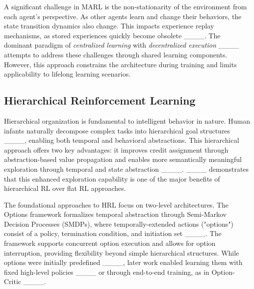 
A significant challenge in MARL is the non-stationarity of the environment from each agent's perspective. As other agents learn and change their behaviors, the state transition dynamics also change. This impacts experience replay mechanisms, as stored experiences quickly become obsolete ____. The dominant paradigm of \emph{centralized learning} with \emph{decentralized execution} ____ attempts to address these challenges through shared learning components. However, this approach constrains the architecture during training and limits applicability to lifelong learning scenarios.


\subsection{Hierarchical Reinforcement Learning}
\vspace{0.1in}
\label{sec:hrl}

Hierarchical organization is fundamental to intelligent behavior in nature. Human infants naturally decompose complex tasks into hierarchical goal structures ____, enabling both temporal and behavioral abstractions. This hierarchical approach offers two key advantages: it improves credit assignment through abstraction-based value propagation and enables more semantically meaningful exploration through temporal and state abstraction ____. ____ demonstrates that this enhanced exploration capability is one of the major benefits of hierarchical RL over flat RL approaches.

The foundational approaches to HRL focus on two-level architectures. The Options framework formalizes temporal abstraction through Semi-Markov Decision Processes (SMDPs), where temporally-extended actions ("options") consist of a policy, termination condition, and initiation set ____. The framework supports concurrent option execution and allows for option interruption, providing flexibility beyond simple hierarchical structures. While options were initially predefined ____, later work enabled learning them with fixed high-level policies ____ or through end-to-end training, as in Option-Critic ____.

